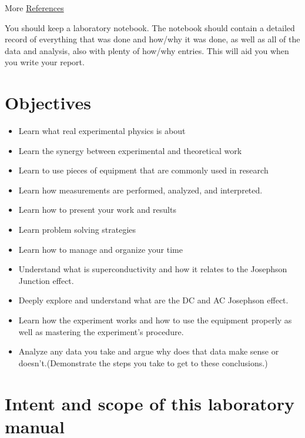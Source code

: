 \documentclass{../lab}
\begin{document}
More \hyperref[sec:References]{References}

You should keep a laboratory notebook. The notebook should contain a detailed record of everything that was done and how/why it was done, as well as all of the data and analysis, also with plenty of how/why entries. This will aid you when you write your report.

\section{Objectives}

\begin{itemize}
    \item Learn what real experimental physics is about

    \item Learn the synergy between experimental and theoretical work

    \item Learn to use pieces of equipment that are commonly used in research

    \item Learn how measurements are performed, analyzed, and interpreted.

    \item Learn how to present your work and results

    \item Learn problem solving strategies

    \item Learn how to manage and organize your time

    \item Understand what is superconductivity and how it relates to the Josephson Junction effect.

    \item Deeply explore and understand what are the DC and AC Josephson effect.

    \item Learn how the experiment works and how to use the equipment properly as well as mastering the experiment's procedure.

    \item Analyze any data you take and argue why does that data make sense or doesn't.(Demonstrate the steps you take to get to these conclusions.)

\end{itemize}

\section{Intent and scope of this laboratory manual}
\end{document}
